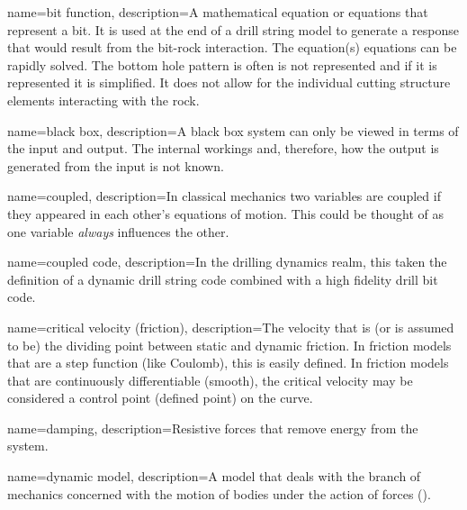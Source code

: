 
\newcommand*{\comma}{,}


{
	name=bit function,
	description=A mathematical equation or equations that represent a bit.  It is used at the end of a drill string model to generate a response that would result from the bit-rock interaction.  The equation(s) equations can be rapidly solved.  The bottom hole pattern is often is not represented and if it is represented it is simplified.  It does not allow for the individual cutting structure elements interacting with the rock.
}

{
	name=black box,
	description={A black box system can only be viewed in terms of the input and output.  The internal workings and, therefore, how the output is generated from the input is not known.}
}

{
	name=coupled,
	description=In classical mechanics two variables are coupled if they appeared in each other's equations of motion.  This could be thought of as one variable \textit{always} influences the other.
}

{
	name=coupled code,
	description=In the drilling dynamics realm\comma{} this taken the definition of a dynamic drill string code combined with a high fidelity drill bit code.
}

{
	name=critical velocity (friction),
    description=The velocity that is (or is assumed to be) the dividing point between static and dynamic friction.  In friction models that are a step function (like Coulomb)\comma{} this is easily defined.  In friction models that are continuously differentiable (smooth)\comma{} the critical velocity may be considered a control point (defined point) on the curve.
}

{
	name=damping,
	description=Resistive forces that remove energy from the system.
}

{
	name=dynamic model,
	description=A model that deals with the branch of mechanics concerned with the motion of bodies under the action of forces (\dynamicforcebalance).
}


